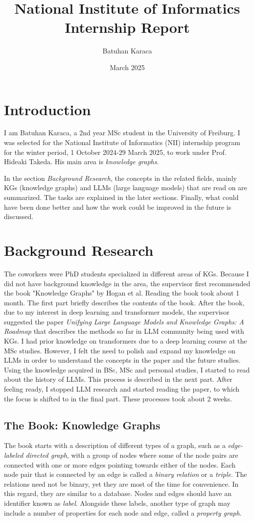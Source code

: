 \documentclass{article}
\title{National Institute of Informatics Internship Report}
\author{Batuhan Karaca}
\date{March 2025}
\begin{document}
\maketitle
\tableofcontents

\section{Introduction}
I am Batuhan Karaca, a 2nd year MSc student in the University of Freiburg. I was selected for the National Institute of Informatics (NII) internship program for the winter period, 1 October 2024-29 March 2025, to work under Prof. Hideaki Takeda. His main area is \textit{knowledge graphs}. 

In the section \textit{Background Research}, the concepts in the related fields, mainly KGs (knowledge graphs) and LLMs (large language models) that are read on are summarized. The tasks are explained in the later sections. Finally, what could have been done better and how the work could be improved in the future is discussed. 
\section{Background Research}
The coworkers were PhD students specialized in different areas of KGs. Because I did not have background knowledge in the area, the supervisor first recommended the book "Knowledge Graphs" by Hogan et al. Reading the book took about 1 month. The first part briefly describes the contents of the book. After the book, due to my interest in deep learning and transformer models, the supervisor suggested the paper \textit{Unifying Large Language Models and Knowledge Graphs: A Roadmap} that describes the methods so far in LLM community being used with KGs. I had prior knowledge on transformers due to a deep learning course at the MSc studies. However, I felt the need to polish and expand my knowledge on LLMs in order to understand the concepts in the paper and the future studies. Using the knowledge acquired in BSc, MSc and personal studies, I started to read about the history of LLMs. This process is described in the next part. After feeling ready, I stopped LLM research and started reading the paper, to which the focus is shifted to in the final part. These processes took about 2 weeks.
\subsection{The Book: Knowledge Graphs}
The book starts with a description of different types of a graph, such as a \textit{edge-labeled directed graph}, with a group of nodes where some of the node pairs are connected with one or more edges pointing towards either of the nodes. Each node pair that is connected by an edge is called a \textit{binary relation} or a \textit{triple}. The relations need not be binary, yet they are most of the time for convenience. In this regard, they are similar to a database. Nodes and edges should have an identifier known as \textit{label}. Alongside these labels, another type of graph may include a number of properties for each node and edge, called a \textit{property graph}. 
\end{document}
